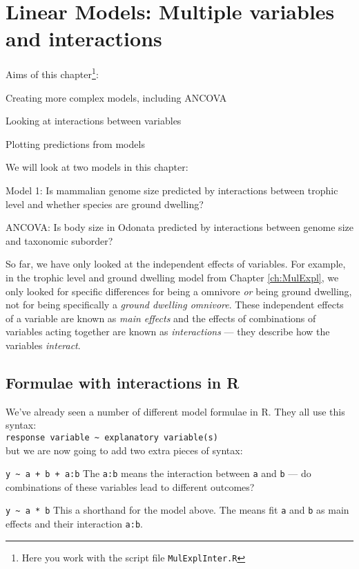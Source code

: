 \chapter{Linear Models: Multiple variables and interactions}
\label{ch:MulExplInter}

Aims of this chapter\footnote{Here you work with the script file {\tt MulExplInter.R}}:
\begin{compactitem}
	\item Creating more complex models, including ANCOVA
	\item Looking at interactions between variables
	\item Plotting predictions from models
\end{compactitem}

We will look at two models in this chapter:
\begin{compactenum}
	\item Model 1: Is mammalian genome size predicted by interactions 
	between trophic level and whether species are ground dwelling?
	\item ANCOVA: Is body size in Odonata predicted by interactions 
	between genome size and taxonomic suborder?
\end{compactenum}

So far, we have only looked at the independent effects of variables. 
For example, in the trophic level and ground dwelling model from 
Chapter \ref{ch:MulExpl}, we only looked for specific differences for being a omnivore 
{\it or} being ground dwelling, not for being specifically a {\it 
ground dwelling omnivore}. These independent effects of a variable are 
known as {\it main effects} and the effects of combinations of 
variables acting together are known as {\it interactions} --- they 
describe how the variables {\it interact}.

\section{Formulae with interactions in R}

We've already seen a number of different model formulae in R. They all 
use this syntax:\\
 {\tt  response variable \textasciitilde\ explanatory variable(s)} \\
but we are now going to add two extra pieces of syntax:

\begin{compactdesc}
	\item [{\tt y \textasciitilde\  a + b + a:b}] The {\tt a:b} means the 
	interaction between {\tt a} and {\tt b} --- do combinations of these 
	variables lead to different outcomes?
	\item [{\tt y \textasciitilde\  a * b}] This a shorthand for the model 
	above. The {\tt *} means fit {\tt a} and {\tt b} as main effects and 
	their interaction {\tt a:b}.
\end{compactdesc}	 

